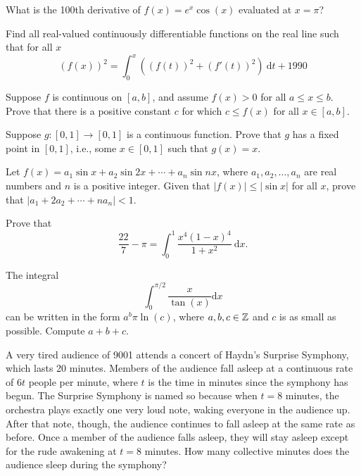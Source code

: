 \documentclass{article}
\begin{document}
\begin{exercise}
What is the 100th derivative of \(f(x)=e^x\cos(x)\) evaluated at \(x=\pi\)?
\end{exercise}

\begin{exercise}
Find all real-valued continuously differentiable functions on the real line such that for all $x$
\[(f(x))^2 = \int_0^x \left((f(t))^2 + (f'(t))^2\right)\ \mathrm{d}t + 1990\]
\end{exercise}

\begin{exercise}
Suppose $f$ is continuous on $[a,b]$, and assume $f(x)>0$ for all $a\leq x \leq b$. Prove that there is a positive constant $c$ for which $c\leq f(x)$ for all $x\in [a,b]$.
\end{exercise}

\begin{exercise}
Suppose $g:[0,1]\to [0,1]$ is a continuous function. Prove that $g$ has a fixed point in $[0,1]$, i.e., some $x\in [0,1]$ such that $g(x)=x$.
\end{exercise}

\begin{exercise} Let $f(x)=a_1\sin{x}+a_2\sin{2x}+\cdots + a_n\sin{nx}$, where $a_1,a_2,\dots,a_n$ are real numbers and $n$ is a positive integer. Given that             $|f(x)|\leq |\sin{x}|$ for all $x$, prove that $|a_1+2a_2+\cdots+na_n|<1$.
\end{exercise}

\begin{exercise}[1968 A1]
    Prove that
    \[\frac{22}{7}-\pi = \int_0^1\frac{x^4(1-x)^4}{1+x^2}\ \mathrm{d}x.\]
\end{exercise}

\begin{exercise}
            The integral
            \[\int_0^{\pi/2}\frac{x}{\tan(x)}\mathrm{d}x\]
            can be written in the form \(a^b\pi\ln(c)\), where \(a,b,c\in\mathbb{Z}\) and \(c\) is as small as possible.
            Compute \(a+b+c\).
        \end{exercise}

\begin{exercise}
            A very tired audience of 9001 attends a concert of Haydn's Surprise Symphony, which lasts 20 minutes.
            Members of the audience fall asleep at a continuous rate of \(6t\) people per minute, where \(t\) is the time in minutes since the symphony has begun.
            The Surprise Symphony is named so because when \(t=8\) minutes, the orchestra plays exactly one very loud note, waking everyone in the audience up.
            After that note, though, the audience continues to fall asleep at the same rate as before.
            Once a member of the audience falls asleep, they will stay asleep except for the rude awakening at \(t=8\) minutes.
            How many collective minutes does the audience sleep during the symphony?
        \end{exercise}
\end{document}
